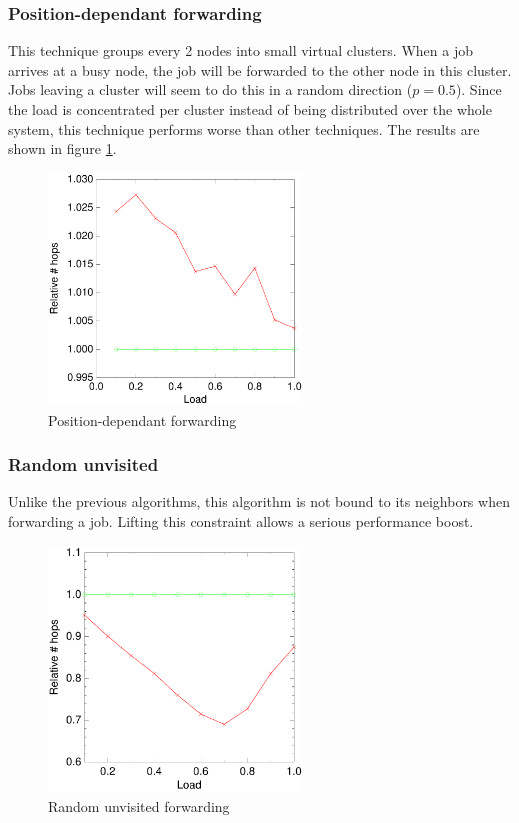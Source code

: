 \documentclass[10pt,a4paper]{article}
\begin{document}
\subsubsection*{Position-dependant forwarding}
This technique groups every 2 nodes into small virtual clusters. When a job arrives at a busy node, the job will be forwarded to the other node in this cluster. Jobs leaving a cluster will seem to do this in a random direction ($p=0.5$). Since the load is concentrated per cluster instead of being distributed over the whole system, this technique performs worse than other techniques. The results are shown in figure \ref{figevenswitch}.

\begin{figure}[h!tb]
\centering
\includegraphics[width=0.6\textwidth]{data/evenswitchright.pdf}
\caption{Position-dependant forwarding}
\label{figevenswitch}
\end{figure}


\subsubsection*{Random unvisited}
Unlike the previous algorithms, this algorithm is not bound to its neighbors when forwarding a job. Lifting this constraint allows a serious performance boost.

\begin{figure}[h!tb]
\centering
\includegraphics[width=0.6\textwidth]{data/randunvisitedright.pdf}
\caption{Random unvisited forwarding}
\label{figrandunvisited}
\end{figure}
\end{document}
